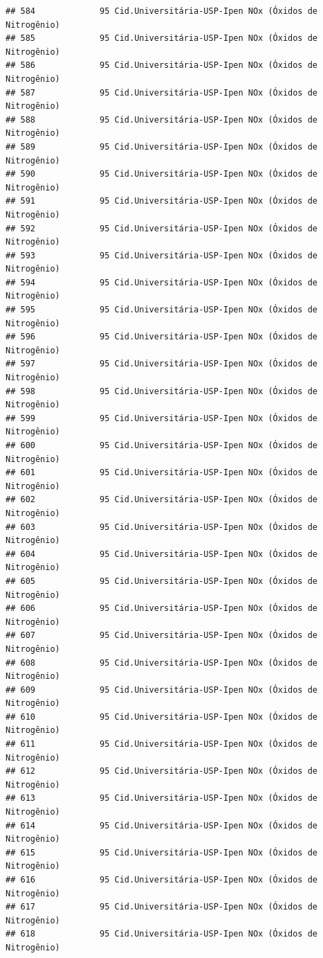 \documentclass[]{book}
\begin{document}
\begin{verbatim}
## 584             95 Cid.Universitária-USP-Ipen NOx (Óxidos de Nitrogênio)
## 585             95 Cid.Universitária-USP-Ipen NOx (Óxidos de Nitrogênio)
## 586             95 Cid.Universitária-USP-Ipen NOx (Óxidos de Nitrogênio)
## 587             95 Cid.Universitária-USP-Ipen NOx (Óxidos de Nitrogênio)
## 588             95 Cid.Universitária-USP-Ipen NOx (Óxidos de Nitrogênio)
## 589             95 Cid.Universitária-USP-Ipen NOx (Óxidos de Nitrogênio)
## 590             95 Cid.Universitária-USP-Ipen NOx (Óxidos de Nitrogênio)
## 591             95 Cid.Universitária-USP-Ipen NOx (Óxidos de Nitrogênio)
## 592             95 Cid.Universitária-USP-Ipen NOx (Óxidos de Nitrogênio)
## 593             95 Cid.Universitária-USP-Ipen NOx (Óxidos de Nitrogênio)
## 594             95 Cid.Universitária-USP-Ipen NOx (Óxidos de Nitrogênio)
## 595             95 Cid.Universitária-USP-Ipen NOx (Óxidos de Nitrogênio)
## 596             95 Cid.Universitária-USP-Ipen NOx (Óxidos de Nitrogênio)
## 597             95 Cid.Universitária-USP-Ipen NOx (Óxidos de Nitrogênio)
## 598             95 Cid.Universitária-USP-Ipen NOx (Óxidos de Nitrogênio)
## 599             95 Cid.Universitária-USP-Ipen NOx (Óxidos de Nitrogênio)
## 600             95 Cid.Universitária-USP-Ipen NOx (Óxidos de Nitrogênio)
## 601             95 Cid.Universitária-USP-Ipen NOx (Óxidos de Nitrogênio)
## 602             95 Cid.Universitária-USP-Ipen NOx (Óxidos de Nitrogênio)
## 603             95 Cid.Universitária-USP-Ipen NOx (Óxidos de Nitrogênio)
## 604             95 Cid.Universitária-USP-Ipen NOx (Óxidos de Nitrogênio)
## 605             95 Cid.Universitária-USP-Ipen NOx (Óxidos de Nitrogênio)
## 606             95 Cid.Universitária-USP-Ipen NOx (Óxidos de Nitrogênio)
## 607             95 Cid.Universitária-USP-Ipen NOx (Óxidos de Nitrogênio)
## 608             95 Cid.Universitária-USP-Ipen NOx (Óxidos de Nitrogênio)
## 609             95 Cid.Universitária-USP-Ipen NOx (Óxidos de Nitrogênio)
## 610             95 Cid.Universitária-USP-Ipen NOx (Óxidos de Nitrogênio)
## 611             95 Cid.Universitária-USP-Ipen NOx (Óxidos de Nitrogênio)
## 612             95 Cid.Universitária-USP-Ipen NOx (Óxidos de Nitrogênio)
## 613             95 Cid.Universitária-USP-Ipen NOx (Óxidos de Nitrogênio)
## 614             95 Cid.Universitária-USP-Ipen NOx (Óxidos de Nitrogênio)
## 615             95 Cid.Universitária-USP-Ipen NOx (Óxidos de Nitrogênio)
## 616             95 Cid.Universitária-USP-Ipen NOx (Óxidos de Nitrogênio)
## 617             95 Cid.Universitária-USP-Ipen NOx (Óxidos de Nitrogênio)
## 618             95 Cid.Universitária-USP-Ipen NOx (Óxidos de Nitrogênio)

\end{verbatim}
\end{document}
